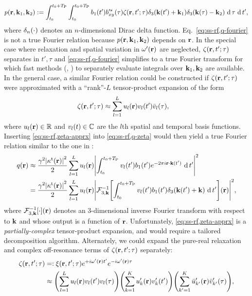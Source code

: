 \begin{align}
	p(\mathbf{r}, \mathbf{k}_1, \mathbf{k}_2) := 
		\int_{t_0}^{t_0+T_\mathrm{P}} \int_{t_0}^{t_0+T_\mathrm{P}} b_1(t') 
		b'^*_{xy}(\tau) \zeta(\mathbf{r}, t'; \tau) \delta_3(\mathbf{k}(t') + \mathbf{k}_1) 
		\delta_3(\mathbf{k}(\tau) - \mathbf{k}_2) \,\operatorname{d}{\tau} \,\operatorname{d}{t}',
	\label{eq:ss-rf,path}
\end{align}
where $\delta_n\paren{\cdot}$ denotes 
an $n$-dimensional Dirac delta function. 
Eq.~\eqref{eq:ss-rf,q-fourier} is not a true Fourier relation 
because $p(\mathbf{r}, \mathbf{k}_1, \mathbf{k}_2)$ 
depends on $\mathbf{r}$. 
In the special case where relaxation and spatial variation 
in $\omp\pr$ are neglected,
$\zeta(\mathbf{r}, t'; \tau)$ separates in $t',\tau$
and \eqref{eq:ss-rf,q-fourier} simplifies 
to a true Fourier transform 
for which fast methods (\eg, \cite{yip:05:irp}) 
to separately evaluate integrals 
over $\mathbf{k}_1,\mathbf{k}_2$ are available. 
In the general case, 
a similar Fourier relation could be constructed 
if $\zeta(\mathbf{r}, t'; \tau)$ were approximated 
with a ``rank''-$L$ tensor-product expansion 
of the form
\begin{align}
	\zeta(\bmr, t'; \tau) &\approx \sum_{l=1}^L u_l\pr v_l(t') \bar{v}_l(\tau), 
	\label{eq:ss-rf,zeta-apprx}
\end{align}
where $u_l\pr \in \real$ 
and $v_l\pt \in \complex$ 
are the $l$th spatial and temporal basis functions. 
Inserting \eqref{eq:ss-rf,zeta-apprx} 
into \eqref{eq:ss-rf,q-zeta} 
would then yield a true Fourier relation 
similar to the one in \cite{fessler:05:tbi}:
\begin{align}
	q\pr &\approx 
		\frac{\gam^2 \abs{\stx\pr}^2 }{2} \sum_{l=1}^L u_l\pr 
		\abs{ \int_{t_0}^{t_0+\TP} v_l(t') \bone(t') e^{-2\pi i \bmr \cdot \bmk(t')} 
		\der t'}^2 
		\nonumber \\
	&= 
		\frac{\gam^2 \abs{\stx\pr}^2 }{2} \sum_{l=1}^L u_l\pr 
		\abs{ \mathcal{F}^{-1}_{3,\bmk} \brac{\int_{t_0}^{t_0+\TP} v_l(t') 
		\bone(t') \delta_3(\bmk(t') + \bmk) \der t'} \paren{\bmr}}^2,
		\label{eq:ss-rf,q-apprx}
\end{align}
where $\mathcal{F}^{-1}_{3,\bmk}\brac{\cdot}\pr$ denotes
an $3$-dimensional inverse Fourier transform
with respect to $\mathbf{k}$
and whose output is a function of $\mathbf{r}$.
Unfortunately, 
\eqref{eq:ss-rf,zeta-apprx} is a \emph{partially-complex} tensor-product expansion, 
and would require a tailored decomposition algorithm. 
Alternately,
we could expand 
the pure-real relaxation and complex off-resonance terms 
of $\zeta(\mathbf{r}, t'; \tau)$ separately:
\begin{align}
	\zeta(\bmr, t'; \tau) &=: 
		\xi(\bmr, t'; \tau) e^{+i\omp\pr t'} e^{-i\omp\pr \tau} 
		\label{eq:ss-rf,xi} \\
	&\approx 
		\paren{\sum_{l=1}^L u_l\pr v_l(t') v_l(\tau)} 
		\paren{\sum_{k=1}^{K} u'_k\pr v'_k(t')} 
		\paren{\sum_{k'=1}^{K} \bar{u}'_{k'}\pr \bar{v}'_{k'}(\tau)},
		\label{eq:ss-rf,xi-apprx}
	\end{align}	
